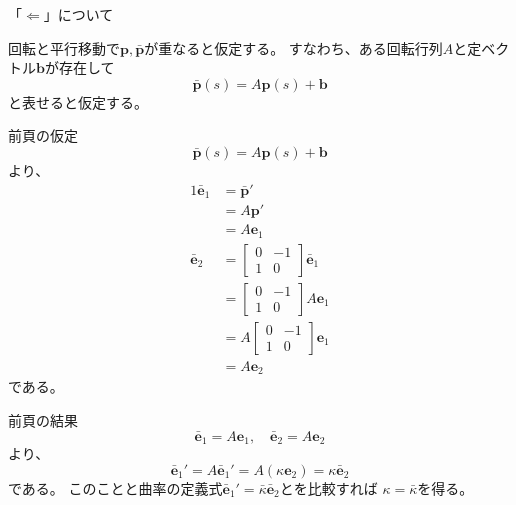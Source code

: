 \documentclass[a4j,disablejfam,dvipdfmx,papersize,slide,uplatex,21pt]{jsarticle}
\makeatletter
\renewenvironment{proof}[1][\proofname]{\par
        \pushQED{\qed}
        \normalfont
        \topsep6\p@\@plus6\p@ \trivlist
        \item[\hskip\labelsep{\bfseries #1}\@addpunct{\bfseries}]\ignorespaces
    }{%
        \popQED\endtrivlist\@endpefalse
    }
\renewcommand{\proofname}{証明.}
\makeatother
\begin{document}
\begin{proof}
    「$\Leftarrow$」について

    回転と平行移動で$\bm{p}, \bar{\bm{p}}$が重なると仮定する。
    すなわち、ある回転行列$A$と定ベクトル$\bm{b}$が存在して
    \begin{equation}
        \bar{\bm{p}}(s) = A \bm{p}(s) + \bm{b}
    \end{equation}
    と表せると仮定する。

    \newpage
    前頁の仮定
    \begin{equation}
        \bar{\bm{p}}(s) = A \bm{p}(s) + \bm{b}
    \end{equation}
    より、
    \begin{alignat}{1}
        \bar{\bm{e}}_1 &= \bar{\bm{p}}' \\
            &= A \bm{p}' \\
            &= A \bm{e}_1 \\
        \bar{\bm{e}}_2
            &=
                \left[
                    \begin{array}{cc}
                        0 & -1 \\
                        1 & 0
                    \end{array}
                \right]
                \bar{\bm{e}}_1 \\
            &=
                \left[
                    \begin{array}{cc}
                        0 & -1 \\
                        1 & 0
                    \end{array}
                \right]
                A \bm{e}_1 \\
            &=
                A \left[
                    \begin{array}{cc}
                        0 & -1 \\
                        1 & 0
                    \end{array}
                \right]
                \bm{e}_1 \\
            &= A \bm{e}_2
    \end{alignat}
    である。

    \newpage
    前頁の結果
    \begin{equation}
        \bar{\bm{e}}_1 = A \bm{e}_1, \quad
        \bar{\bm{e}}_2 = A \bm{e}_2
    \end{equation}
    より、
    \begin{equation}
        \bar{\bm{e}}_1' = A \bar{\bm{e}}_1' = A (\kappa \bm{e}_2) = \kappa \bar{\bm{e}}_2
    \end{equation}
    である。
    このことと曲率の定義式$\bar{\bm{e}}_1' = \bar{\kappa} \bar{\bm{e}}_2$とを比較すれば
    $\kappa = \bar{\kappa}$を得る。


\end{proof}
\end{document}
